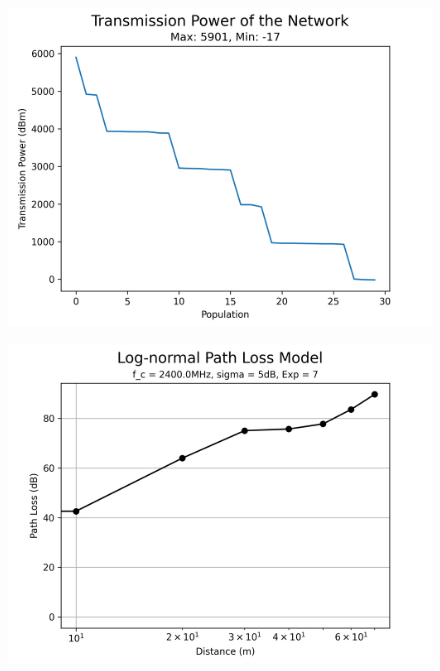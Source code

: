 \begin{figure}[H]
  \centering
  \begin{minipage}[t]{0.5\textwidth}
      \centering
      \includegraphics[width=1\linewidth]{images/research_results/genetic_algorithm_different_parameter_power.png}
      \label{fig:genetic_algorithm_different_parameter_power}
  \end{minipage}\hfill
  \begin{minipage}[t]{0.5\textwidth}
      \centering
      \includegraphics[width=1\linewidth]{images/research_results/path-loss-different-parameter.png}
      \label{fig:path_loss_different_parameter}
  \end{minipage}
\end{figure}

